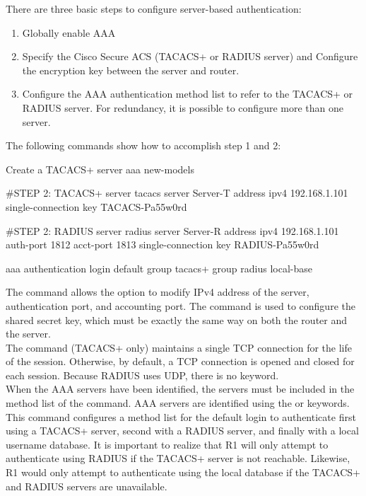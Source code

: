 There are three basic steps to configure server-based authentication:

\begin{enumerate}
\item Globally enable AAA
\item Specify the Cisco Secure ACS (TACACS+ or RADIUS server) and Configure the encryption key between the server and router.
\item Configure the AAA authentication method list to refer to the TACACS+ or RADIUS server. For redundancy, it is possible to configure more than one server.
\end{enumerate}

The following commands show how to accomplish step 1 and 2:

\begin{sexylisting}{Create a TACACS+ server}
aaa new-models

#STEP 2: TACACS+ server
tacacs server Server-T
  address ipv4 192.168.1.101
  single-connection
  key TACACS-Pa55w0rd

#STEP 2: RADIUS server 
radius server Server-R
  address ipv4 192.168.1.101 auth-port 1812 acct-port 1813
  single-connection
  key RADIUS-Pa55w0rd

aaa authentication login default group tacacs+ group radius local-base  
\end{sexylisting}

The  command allows the option to modify IPv4 address of the server, authentication port, and accounting port. The  command is used to configure the shared secret key, which must be exactly the same way on both the router and the server.\\

The  command (TACACS+ only) maintains a single TCP connection for the life of the session. Otherwise, by default, a TCP connection is opened and closed for each session. Because RADIUS uses UDP, there is no  keyword.\\

When the AAA servers have been identified, the servers must be included in the method list of the  command. AAA servers are identified using the  or  keywords. This command configures a method list for the default login to authenticate first using a TACACS+ server, second with a RADIUS server, and finally with a local username database. It is important to realize that R1 will only attempt to authenticate using RADIUS if the TACACS+ server is not reachable. Likewise, R1 would only attempt to authenticate using the local database if the TACACS+ and RADIUS servers are unavailable.

